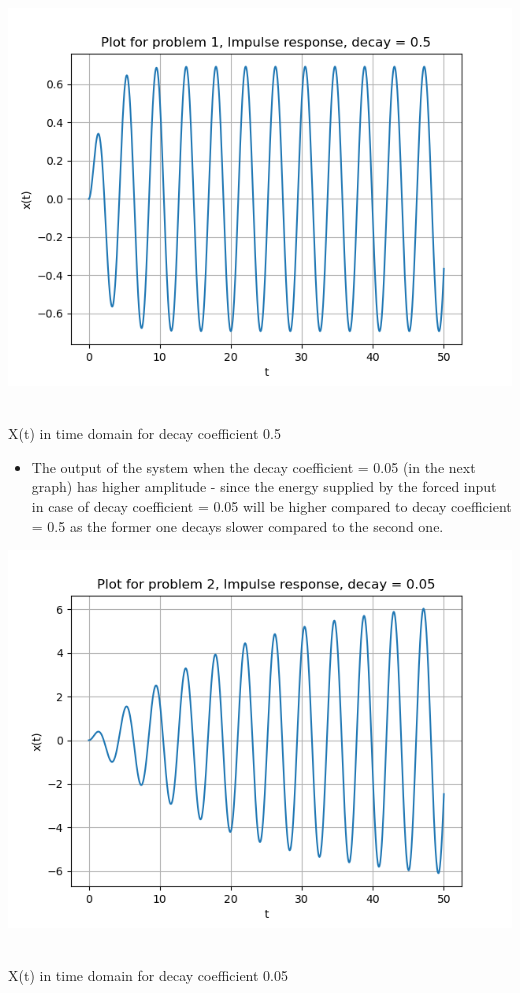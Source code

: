 \documentclass[12pt, a4paper]{report}
\begin{document}
\begin{center}
	\includegraphics[scale=0.8]{Figure_1.png} 
	\caption{\\X(t) in time domain for decay coefficient 0.5}
	\label{fig:rawdata}
\end{center}

\begin{itemize}
     \item The output of the system when the decay coefficient = 0.05 (in the next graph) has higher amplitude - since the energy supplied by the forced input in case of decay coefficient = 0.05 will be higher compared to decay coefficient = 0.5 as the former one decays slower compared to the second one.
\end{itemize}

\begin{center}
	\includegraphics[scale=0.8]{Figure_2.png} 
	\caption{\\X(t) in time domain for decay coefficient 0.05}
	\label{fig:rawdata}
\end{center}
\end{document}
